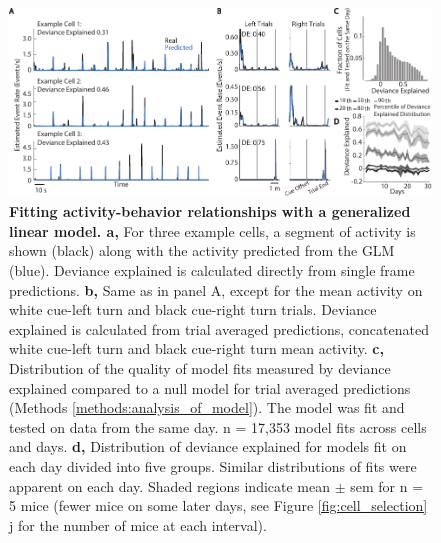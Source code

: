 \begin{figure}
\includegraphics[width=\textwidth]{figures/4_glm_fits.pdf}
\caption[Fitting activity-behavior relationships with a generalized linear model.]{\textbf{Fitting activity-behavior relationships with a generalized linear model. a,} For three example cells, a segment of activity is shown (black) along with the activity predicted from the GLM (blue). Deviance explained is calculated directly from single frame predictions.
%
\textbf{b,} Same as in panel A, except for the mean activity on white cue-left turn and black cue-right turn trials. Deviance explained is calculated from trial averaged predictions, concatenated white cue-left turn and black cue-right turn mean activity.
%
\textbf{c,} Distribution of the quality of model fits measured by deviance explained compared to a null model for trial averaged predictions (Methods \ref{methods:analysis_of_model}). The model was fit and tested on data from the same day. n = 17,353 model fits across cells and days.
%
\textbf{d,} Distribution of deviance explained for models fit on each day divided into five groups. Similar distributions of fits were apparent on each day. Shaded regions indicate mean $\pm$ sem for n = 5 mice (fewer mice on some later days, see Figure \ref{fig:cell_selection} j for the number of mice at each interval).
\label{fig:4_glm_fits}}
\end{figure}

\bigskip

